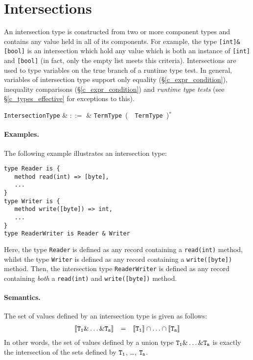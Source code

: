 \section{Intersections}
\label{c_types_intersections}

An intersection type is constructed from two or more component types and contains any value held in all of its components.  For example, the type \lstinline{[int]&[bool]} is an intersection which hold any value which is both an instance of \lstinline{[int]} and \lstinline{[bool]} (in fact, only the empty list meets this criteria).  Intersections are used to type variables on the true branch of a runtime type test.  In general, variables of intersection type support only equality (\S\ref{c_expr_condition}), inequality comparisons (\S\ref{c_expr_condition}) and {\em runtime type tests} (see \S\ref{c_types_effective} for exceptions to this).

\begin{syntax}
  \verb+IntersectionType+ & $::=$ & \verb+TermType+\ \big(\ \token{\&}\ \verb+TermType+\
  \big)$^*$\\
\end{syntax}

\paragraph{Examples.}  The following example illustrates an intersection type:

\begin{lstlisting}
type Reader is { 
   method read(int) => [byte],
   ...
}
type Writer is { 
   method write([byte]) => int,
   ...
}
type ReaderWriter is Reader & Writer
\end{lstlisting}
Here, the type \lstinline{Reader} is defined as any record containing a \lstinline{read(int)} method, whilst the type \lstinline{Writer} is defined as any record containing a \lstinline{write([byte])} method.  Then, the intersection type \lstinline{ReaderWriter} is defined as any record containing {\em both} a \lstinline{read(int)} and \lstinline{write([byte])} method.

\paragraph{Semantics.}  The set of values defined by an intersection type is given as follows:
\begin{displaymath}
\begin{array}{rcl}
{\tt\llbracket T_1\&\ldots\&T_n\rrbracket} & = & {\tt \llbracket T_1\rrbracket\cap\ldots\cap \llbracket T_n\rrbracket}\\
\end{array}
\end{displaymath}
In other words, the set of values defined by a union type ${\tt T_1\&\ldots\&T_n}$ is exactly the intersection of the sets defined by ${\tt T_1}$, \ldots, ${\tt T_n}$.

